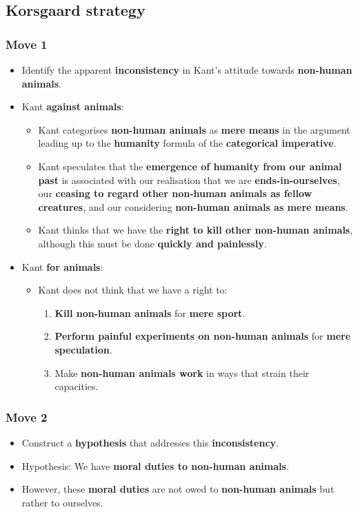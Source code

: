 \documentclass[11pt]{article}
\begin{document}
\subsection{Korsgaard strategy}
\label{sec:org0807e49}

\subsubsection{Move 1}
\label{sec:org129dce1}
\begin{itemize}
\item Identify the apparent \textbf{inconsistency} in Kant's attitude towards \textbf{non-human animals}.
\item Kant \textbf{against animals}:
\begin{itemize}
\item Kant categorises \textbf{non-human animals} as \textbf{mere means} in the argument leading up to the \textbf{humanity} formula of the \textbf{categorical imperative}.
\item Kant speculates that the \textbf{emergence of humanity from our animal past} is associated with our realisation that we are \textbf{ends-in-ourselves}, our \textbf{ceasing to regard other non-human animals as fellow creatures}, and our considering \textbf{non-human animals as mere means}.
\item Kant thinks that we have the \textbf{right to kill other non-human animals}, although this must be done \textbf{quickly and painlessly}.
\end{itemize}
\item Kant \textbf{for animals}:
\begin{itemize}
\item Kant does not think that we have a right to:
\begin{enumerate}
\item \textbf{Kill non-human animals} for \textbf{mere sport}.
\item \textbf{Perform painful experiments on non-human animals} for \textbf{mere speculation}.
\item Make \textbf{non-human animals work} in ways that strain their capacities.
\end{enumerate}
\end{itemize}
\end{itemize}
\subsubsection{Move 2}
\label{sec:orga1f7aa6}
\begin{itemize}
\item Construct a \textbf{hypothesis} that addresses this \textbf{inconsistency}.
\item Hypothesis: We have \textbf{moral duties to non-human animals}.
\item However, these \textbf{moral duties} are not owed to \textbf{non-human animals} but rather to ourselves.
\end{itemize}
\end{document}
